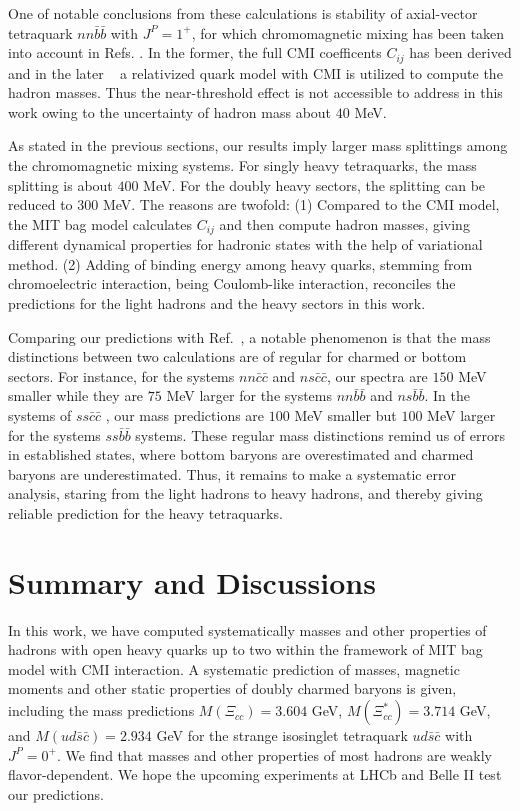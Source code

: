 \documentclass[prt,twocolumn,floatfix,nofootinbib]{revtex4}
\begin{document}
One of notable conclusions from these calculations is stability of axial-vector tetraquark $nn\bar{b}\bar{b}$ with $J^{P}=1^{+}$, for which chromomagnetic mixing has been taken into account in Refs. \cite{Luo:2017eub,Lu:2020rog}. In the former, the full CMI coefficents $C_{ij}$ has been derived and in the later ~\cite{Lu:2020rog} a relativized quark model with CMI is utilized to compute the hadron masses. 
Thus the near-threshold effect is not accessible to address in this work owing to the uncertainty of hadron mass about $40$ MeV. 

As stated in the previous sections, our results imply larger mass splittings among the chromomagnetic mixing systems. For singly heavy tetraquarks, the mass splitting is about $400$ MeV. For the doubly heavy sectors, the splitting can be reduced to $300$ MeV.
The reasons are twofold:
(1) Compared to the CMI model, the MIT bag model calculates $C_{ij}$ and then compute hadron masses, giving different dynamical properties for hadronic states with the help of variational method.
(2) Adding of binding energy among heavy quarks, stemming from chromoelectric interaction, being Coulomb-like interaction, reconciles the predictions for the light hadrons and the heavy sectors in this work.

Comparing our predictions with Ref.~\cite{Lu:2020rog}, a notable phenomenon is that the mass distinctions between two calculations are of regular for charmed or bottom sectors.
For instance, for the systems $nn\bar{c}\bar{c}$ and $ns\bar{c}\bar{c}$, our spectra are $150$ MeV smaller while they are $75$ MeV larger for the systems $nn\bar{b}\bar{b}$ and $ns\bar{b}\bar{b}$.
In the systems of $ss\bar{c}\bar{c}$ , our mass predictions are $100$ MeV smaller but $100$ MeV larger for the systems $ss\bar{b}\bar{b}$ systems.
These regular mass distinctions remind us of errors in established states, where bottom baryons are overestimated and charmed baryons are underestimated.
Thus, it remains to make a systematic error analysis, staring from the light hadrons to heavy hadrons, and thereby giving reliable prediction for the heavy tetraquarks.


\section{Summary and Discussions}\label{Discussions}
In this work, we have computed systematically masses and other properties of hadrons with open heavy quarks up to two within the framework of MIT bag model with CMI interaction. A systematic prediction of masses, magnetic moments and other static properties of doubly charmed baryons is given, including the mass predictions $M(\Xi_{cc})=3.604$ GeV, $M(\Xi_{cc}^{\ast})=3.714$ GeV, and $M\left(ud\bar{s}\bar{c}\right)=2.934$ GeV for the strange isosinglet tetraquark $ud\bar{s}\bar{c}$ with $J^{P}=0^{+}$. We find that masses and other properties of most hadrons are weakly flavor-dependent. We hope the upcoming experiments at LHCb and Belle II test our predictions.
\end{document}

